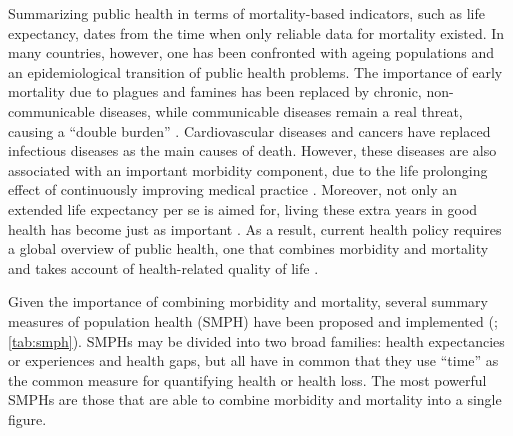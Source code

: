 \documentclass[]{book}
\begin{document}
Summarizing public health in terms of mortality-based indicators, such
as life expectancy, dates from the time when only reliable data for
mortality existed. In many countries, however, one has been confronted
with ageing populations and an epidemiological transition of public
health problems. The importance of early mortality due to plagues and
famines has been replaced by chronic, non-communicable diseases, while
communicable diseases remain a real threat, causing a ``double burden''
\citep{marshall2004developing}. Cardiovascular diseases and cancers have
replaced infectious diseases as the main causes of death. However, these
diseases are also associated with an important morbidity component, due
to the life prolonging effect of continuously improving medical practice
\citep{jelenc2012joint}. Moreover, not only an extended life expectancy
per se is aimed for, living these extra years in good health has become
just as important \citep{bryant2001their}. As a result, current health
policy requires a global overview of public health, one that combines
morbidity and mortality and takes account of health-related quality of
life \citep{robine2013joint}.

Given the importance of combining morbidity and mortality, several
summary measures of population health (SMPH) have been proposed and
implemented (\citet{murray2000critical}; \ref{tab:smph}). SMPHs may be
divided into two broad families: health expectancies or experiences and
health gaps, but all have in common that they use ``time'' as the common
measure for quantifying health or health loss. The most powerful SMPHs
are those that are able to combine morbidity and mortality into a single
figure.
\end{document}
